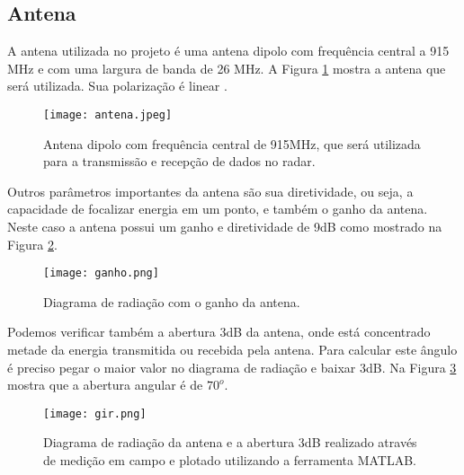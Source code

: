 \subsection{Antena}
A antena utilizada no projeto é uma antena dipolo com frequência central a 915 MHz e com uma largura de banda de 26 MHz. A Figura \ref{antena} mostra a antena que será utilizada. Sua polarização é linear \cite{balanis}.
\begin{figure}[H]
    \centering
   \texttt{[image: antena.jpeg]}
   \caption{Antena dipolo com frequência central de 915MHz, que será utilizada para a transmissão e recepção de dados no radar.}
   \label{antena}
    \end{figure}
Outros parâmetros importantes da antena são sua diretividade, ou seja, a capacidade de focalizar energia em um ponto, e também o ganho da antena. Neste caso a antena possui um ganho e diretividade de 9dB como mostrado na Figura \ref{ganho}.
\begin{figure}[H]
    \centering
   \texttt{[image: ganho.png]}
   \caption{Diagrama de radiação com o ganho da antena.}
   \label{ganho}
    \end{figure}
Podemos verificar também a abertura 3dB da antena, onde está concentrado metade da energia transmitida ou recebida pela antena.  Para calcular este ângulo é preciso pegar o maior valor no diagrama de radiação e baixar 3dB. Na Figura \ref{dr} mostra que a abertura angular é de $70^o$.
\begin{figure}[t]
    \centering
   \texttt{[image: gir.png]}
   \caption{Diagrama de radiação da antena e a abertura 3dB realizado através de medição em campo e plotado utilizando a ferramenta MATLAB.}
   \label{dr}
    \end{figure}
